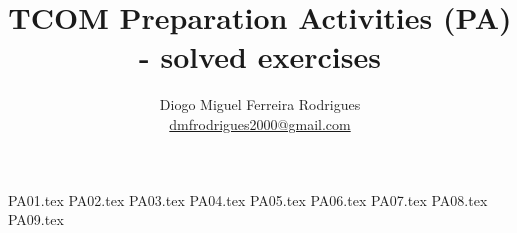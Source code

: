 \documentclass[a4paper]{article}
\title{TCOM Preparation Activities (PA) - solved exercises}
\author{Diogo Miguel Ferreira Rodrigues \\ \href{mailto:dmfrodrigues2000@gmail.com}{dmfrodrigues2000@gmail.com}}
\date{}
\begin{document}
\begingroup
	\maketitle
	\let\clearpage\relax
	\setcounter{tocdepth}{2}
	\tableofcontents
\endgroup
{PA01.tex}
{PA02.tex}
{PA03.tex}
{PA04.tex}
{PA05.tex}
{PA06.tex}
{PA07.tex}
{PA08.tex}
{PA09.tex}
\end{document}
